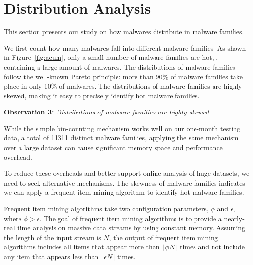 \section{Distribution Analysis}
\label{sec:dist}









This section presents our study on how malwares distribute in malware families. 

We first count how many malwares fall into different malware families.
As shown in Figure~\ref{fig:acum}, only a small number of malware families are hot, \ie, containing a large amount of malwares.
The distributions of malware families follow the well-known Pareto principle:  
more than 90\% of malware families take place in only 10\% of malwares. 
The distributions of malware families are highly skewed,
making it easy to precisely identify hot malware families. 

{\bf Observation 3:} {\em Distributions of malware families are highly skewed.} 

While the simple bin-counting mechanism works well on our one-month testing data, 
a total of 11311 distinct malware families, 
applying the same mechanism over a large dataset can cause significant memory space and performance overhead.

To reduce these overheads and better support online analysis of huge datasets, 
we need to seek alternative mechanisms.
The skewness of malware families indicates we can apply a frequent item mining algorithm to identify hot malware families. 

Frequent item mining algorithms take two configuration parameters, $\phi$ and $\epsilon$, where $\phi > \epsilon$. 
The goal of frequent item mining algorithms is to provide a nearly-real time analysis on massive data streams by using constant memory. 
Assuming the length of the input stream is $N$, the output of frequent item mining algorithms 
includes all items that appear more than $\lfloor \phi N \rfloor$ times 
and not include any item that appears less than  $\lfloor \epsilon N \rfloor$ times. 

